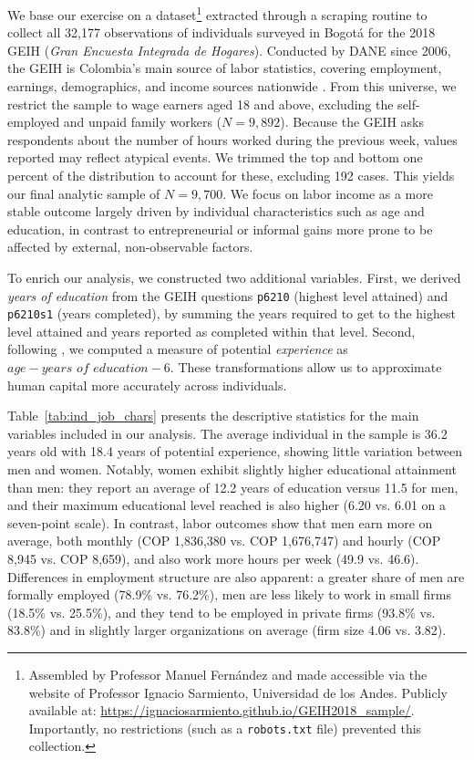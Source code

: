 \documentclass[12pt,a4paper,onecolumn]{article}
\begin{document}
We base our exercise on a dataset\footnote{Assembled by Professor Manuel Fern\'andez and made accessible via the website of Professor Ignacio Sarmiento, Universidad de los Andes. Publicly available at: \url{https://ignaciosarmiento.github.io/GEIH2018_sample/}. Importantly, no restrictions (such as a \texttt{robots.txt} file) prevented this collection.} extracted through a scraping routine to collect all 32,177 observations of individuals surveyed in Bogot\'a for the 2018 GEIH (\textit{Gran Encuesta Integrada de Hogares}). Conducted by DANE since 2006, the GEIH is Colombia's main source of labor statistics, covering employment, earnings, demographics, and income sources nationwide \citep{Banrep2025, DANE2025b}. From this universe, we restrict the sample to wage earners aged 18 and above, excluding the self-employed and unpaid family workers ($N=9{,}892$). Because the GEIH asks respondents about the number of hours worked during the previous week, values reported may reflect atypical events. We trimmed the top and bottom one percent of the distribution to account for these, excluding 192 cases. This yields our final analytic sample of $N=9{,}700$. We focus on labor income as a more stable outcome largely driven by individual characteristics such as age and education, in contrast to entrepreneurial or informal gains more prone to be affected by external, non-observable factors. 

To enrich our analysis, we constructed two additional variables. First, we derived \textit{years of education} from the GEIH questions \texttt{p6210} (highest level attained) and \texttt{p6210s1} (years completed), by summing the years required to get to the highest level attained and years reported as completed within that level. Second, following \citep{Fernandez2018}, we computed a measure of potential \textit{experience} as \ensuremath{\textit{age} - \textit{years of education} - 6}. These transformations allow us to approximate human capital more accurately across individuals.

Table~\hyperref[tab:ind_job_chars]{\ref{tab:ind_job_chars}} presents the descriptive statistics for the main variables included in our analysis. The average individual in the sample is 36.2 years old with 18.4 years of potential experience, showing little variation between men and women. Notably, women exhibit slightly higher educational attainment than men: they report an average of 12.2 years of education versus 11.5 for men, and their maximum educational level reached is also higher (6.20 vs. 6.01 on a seven-point scale). In contrast, labor outcomes show that men earn more on average, both monthly (COP 1,836,380 vs. COP 1,676,747) and hourly (COP 8,945 vs. COP 8,659), and also work more hours per week (49.9 vs. 46.6). Differences in employment structure are also apparent: a greater share of men are formally employed (78.9\% vs. 76.2\%), men are less likely to work in small firms (18.5\% vs. 25.5\%), and they tend to be employed in private firms (93.8\% vs. 83.8\%) and in slightly larger organizations on average (firm size 4.06 vs. 3.82).
\end{document}
